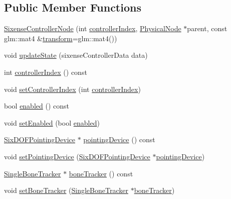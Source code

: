 \subsection*{Public Member Functions}
\begin{DoxyCompactItemize}
\item 
\hyperlink{classmotorcar_1_1SixenseControllerNode_acb326fa6a4174d767eedc5563cf8f3bb}{Sixense\-Controller\-Node} (int \hyperlink{classmotorcar_1_1SixenseControllerNode_aa061782ed3ae2a57180fdad9dc6383d9}{controller\-Index}, \hyperlink{classmotorcar_1_1PhysicalNode}{Physical\-Node} $\ast$parent, const glm\-::mat4 \&\hyperlink{classmotorcar_1_1SceneGraphNode_ad96e79fdd739ac8223a3128003be391a}{transform}=glm\-::mat4())
\item 
void \hyperlink{classmotorcar_1_1SixenseControllerNode_afbe76474cf77da7e11b0ac1b291b51f3}{update\-State} (sixense\-Controller\-Data data)
\item 
int \hyperlink{classmotorcar_1_1SixenseControllerNode_aa061782ed3ae2a57180fdad9dc6383d9}{controller\-Index} () const 
\item 
void \hyperlink{classmotorcar_1_1SixenseControllerNode_a337d87a6667b7e35301978c8017f2b20}{set\-Controller\-Index} (int \hyperlink{classmotorcar_1_1SixenseControllerNode_aa061782ed3ae2a57180fdad9dc6383d9}{controller\-Index})
\item 
bool \hyperlink{classmotorcar_1_1SixenseControllerNode_a46ff3af0aa1723d13a7f2a2be599a786}{enabled} () const 
\item 
void \hyperlink{classmotorcar_1_1SixenseControllerNode_aae977f21555500a932f2d9e7a670acd9}{set\-Enabled} (bool \hyperlink{classmotorcar_1_1SixenseControllerNode_a46ff3af0aa1723d13a7f2a2be599a786}{enabled})
\item 
\hyperlink{classmotorcar_1_1SixDOFPointingDevice}{Six\-D\-O\-F\-Pointing\-Device} $\ast$ \hyperlink{classmotorcar_1_1SixenseControllerNode_adc631d1698a4dcf1d72efb8912a76e1a}{pointing\-Device} () const 
\item 
void \hyperlink{classmotorcar_1_1SixenseControllerNode_aa3723c41d3512b53db0708bb86465941}{set\-Pointing\-Device} (\hyperlink{classmotorcar_1_1SixDOFPointingDevice}{Six\-D\-O\-F\-Pointing\-Device} $\ast$\hyperlink{classmotorcar_1_1SixenseControllerNode_adc631d1698a4dcf1d72efb8912a76e1a}{pointing\-Device})
\item 
\hyperlink{classmotorcar_1_1SingleBoneTracker}{Single\-Bone\-Tracker} $\ast$ \hyperlink{classmotorcar_1_1SixenseControllerNode_a96ebf0431751aad1153ac0da8845257d}{bone\-Tracker} () const 
\item 
void \hyperlink{classmotorcar_1_1SixenseControllerNode_a99cb44bf2c021c990b9f8bdc46f178f1}{set\-Bone\-Tracker} (\hyperlink{classmotorcar_1_1SingleBoneTracker}{Single\-Bone\-Tracker} $\ast$\hyperlink{classmotorcar_1_1SixenseControllerNode_a96ebf0431751aad1153ac0da8845257d}{bone\-Tracker})
\end{DoxyCompactItemize}
